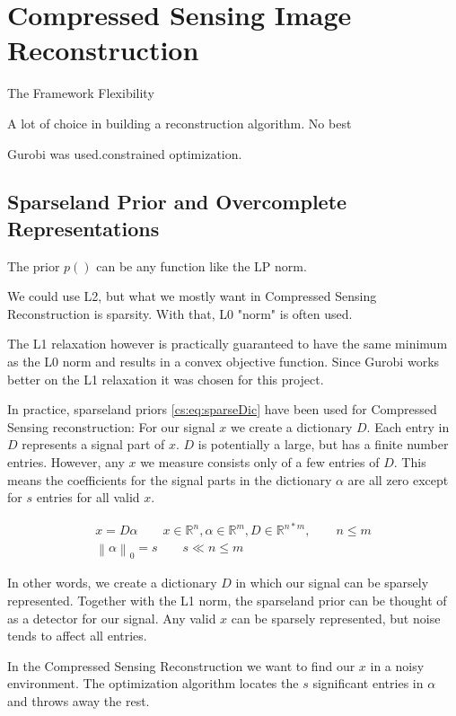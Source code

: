 \section{Compressed Sensing Image Reconstruction} \label{cs}

The Framework Flexibility

A lot of choice in building a reconstruction algorithm. No best

Gurobi\cite{gurobi2018optimizer} was used.constrained optimization.


\subsection{Sparseland Prior and Overcomplete Representations}
The prior $p()$ can be any function like the LP norm.

We could use L2, but what we mostly want in Compressed Sensing Reconstruction is sparsity. 
With that, L0 "norm" is often used. 


The L1 relaxation however is practically guaranteed to have the same minimum as the L0 norm and results in a convex objective function. Since Gurobi works better on the L1 relaxation it was chosen for this project.

In practice, sparseland priors \eqref{cs:eq:sparseDic} have been used for Compressed Sensing reconstruction: For our signal $x$ we create a dictionary $D$. Each entry in $D$ represents a signal part of $x$. $D$ is potentially a large, but has a finite number entries. However, any $x$ we measure consists only of a few entries of $D$. This means the coefficients for the signal parts in the dictionary $\alpha$ are all zero except for $s$ entries for all valid $x$. 

\begin{equation} \label{cs:eq:sparseDic}
\begin{split}
x = D \alpha  \qquad  x \in \mathbb{R}^{n}, \alpha \in \mathbb{R}^{m}, D \in \mathbb{R}^{n*m}, \qquad n \leq m \\
\left \| \alpha \right \|_0 = s \qquad s \ll n \leq m
\end{split}
\end{equation}

In other words, we create a dictionary $D$ in which our signal can be sparsely represented. Together with the L1 norm, the sparseland prior can be thought of as a detector for our signal. Any valid $x$ can be sparsely represented, but noise tends to affect all entries.

In the Compressed Sensing Reconstruction we want to find our $x$ in a noisy environment. The optimization algorithm locates the $s$ significant entries in $\alpha$ and throws away the rest.

